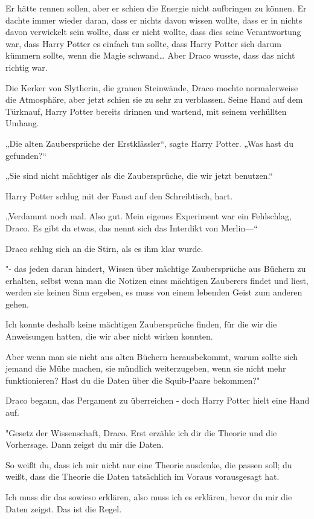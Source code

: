 {Er hätte rennen sollen, aber er schien die Energie nicht aufbringen zu können. Er dachte immer wieder daran, dass er nichts davon wissen wollte, dass er in nichts davon verwickelt sein wollte, dass er nicht wollte, dass dies seine Verantwortung war, dass Harry Potter es einfach tun sollte, dass Harry Potter sich darum kümmern sollte, wenn die Magie schwand… Aber Draco wusste, dass das nicht richtig war.

Die Kerker von Slytherin, die grauen Steinwände, Draco mochte normalerweise die Atmosphäre, aber jetzt schien sie zu sehr zu verblassen. Seine Hand auf dem Türknauf, Harry Potter bereits drinnen und wartend, mit seinem verhüllten Umhang.

„Die alten Zaubersprüche der Erstklässler“, sagte Harry Potter. „Was hast du gefunden?“

„Sie sind nicht mächtiger als die Zaubersprüche, die wir jetzt benutzen.“

Harry Potter schlug mit der Faust auf den Schreibtisch, hart.

„Verdammt noch mal. Also gut. Mein eigenes Experiment war ein Fehlschlag, Draco. Es gibt da etwas, das nennt sich das Interdikt von Merlin—“

Draco schlug sich an die Stirn, als es ihm klar wurde.

"- das jeden daran hindert, Wissen über mächtige Zaubersprüche aus Büchern zu erhalten, selbst wenn man die Notizen eines mächtigen Zauberers findet und liest, werden sie keinen Sinn ergeben, es muss von einem lebenden Geist zum anderen gehen.

Ich konnte deshalb keine mächtigen Zaubersprüche finden, für die wir die Anweisungen hatten, die wir aber nicht wirken konnten.

Aber wenn man sie nicht aus alten Büchern herausbekommt, warum sollte sich jemand die Mühe machen, sie mündlich weiterzugeben, wenn sie nicht mehr funktionieren? Hast du die Daten über die Squib-Paare bekommen?"

Draco begann, das Pergament zu überreichen - doch Harry Potter hielt eine Hand auf.

"Gesetz der Wissenschaft, Draco. Erst erzähle ich dir die Theorie und die Vorhersage. Dann zeigst du mir die Daten.

So weißt du, dass ich mir nicht nur eine Theorie ausdenke, die passen soll; du weißt, dass die Theorie die Daten tatsächlich im Voraus vorausgesagt hat.

Ich muss dir das sowieso erklären, also muss ich es erklären, bevor du mir die Daten zeigst. Das ist die Regel.

}
